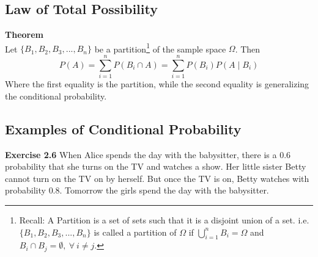 \documentclass[12pt]{book}
\begin{document}
\subsection{Law of Total Possibility}
\textbf{Theorem}\\
Let $\{B_1,B_2,B_3,...,B_n\}$ be a partition\footnote{Recall: A Partition is a set of sets such that it is a disjoint union of a set.
i.e. $\{B_1,B_2,B_3,...,B_n\}$ is called a partition of $\Omega$ if $\bigcup\limits_{i=1}^{n} B_{i}=\Omega$ and $B_{i}\cap B_{j}=\emptyset,~\forall~i\neq j.$} of the sample space $\Omega$. Then 
$$\boxed{P(A)=\sum\limits_{i=1}^{n} P(B_{i}\cap A)=\sum\limits_{i=1}^{n}P(B_{i})P(A\mid B_{i})}$$
Where the first equality is the partition, while the second equality is generalizing the conditional probability.




\subsection{Examples of Conditional Probability}
\textbf{Exercise 2.6} When Alice spends the day with the babysitter, there is a $0.6$ probability that she turns on the TV and watches a show. Her little sister Betty cannot turn on the TV on by herself. But once the TV is on, Betty watches with probability $0.8$. Tomorrow the girls spend the day with the babysitter.\\

\end{document}
